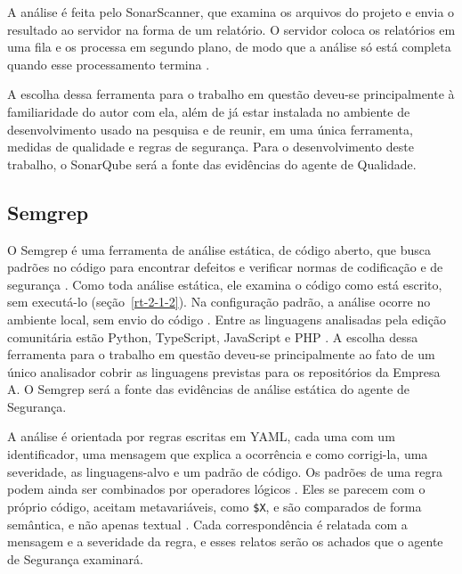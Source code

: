 A análise é feita pelo SonarScanner, que examina os arquivos do projeto e envia o resultado ao servidor na forma de um relatório. O servidor coloca os relatórios em uma fila e os processa em segundo plano, de modo que a análise só está completa quando esse processamento termina \cite{sonarAnalysis99}.

A escolha dessa ferramenta para o trabalho em questão deveu-se principalmente à familiaridade do autor com ela, além de já estar instalada no ambiente de desenvolvimento usado na pesquisa e de reunir, em uma única ferramenta, medidas de qualidade e regras de segurança. Para o desenvolvimento deste trabalho, o SonarQube será a fonte das evidências do agente de Qualidade.

\subsection{Semgrep}
\label{st-semgrep}

O Semgrep é uma ferramenta de análise estática, de código aberto, que busca padrões no código para encontrar defeitos e verificar normas de codificação e de segurança \cite{semgrepReadme}. Como toda análise estática, ele examina o código como está escrito, sem executá-lo (seção~\ref{rt-2-1-2}). Na configuração padrão, a análise ocorre no ambiente local, sem envio do código \cite{semgrepReadme}. Entre as linguagens analisadas pela edição comunitária estão Python, TypeScript, JavaScript e PHP \cite{semgrepDocs}. A escolha dessa ferramenta para o trabalho em questão deveu-se principalmente ao fato de um único analisador cobrir as linguagens previstas para os repositórios da Empresa A. O Semgrep será a fonte das evidências de análise estática do agente de Segurança.

A análise é orientada por regras escritas em YAML, cada uma com um identificador, uma mensagem que explica a ocorrência e como corrigi-la, uma severidade, as linguagens-alvo e um padrão de código. Os padrões de uma regra podem ainda ser combinados por operadores lógicos \cite{semgrepRuleSyntax}. Eles se parecem com o próprio código, aceitam metavariáveis, como \texttt{\$X}, e são comparados de forma semântica, e não apenas textual \cite{semgrepPatternSyntax}. Cada correspondência é relatada com a mensagem e a severidade da regra, e esses relatos serão os achados que o agente de Segurança examinará.

